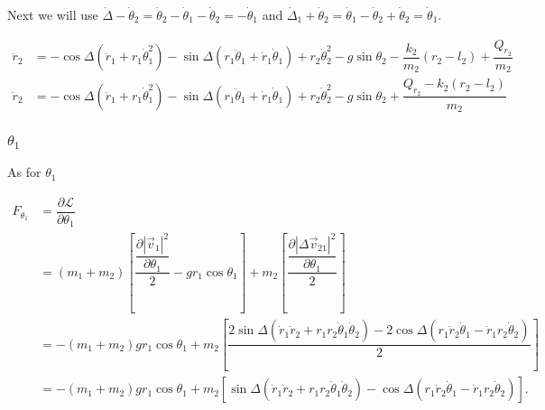 \documentclass[12pt,a4paper,portrait]{article}
\newcommand{\lag}{\mathcal{L}}
\begin{document}
\begin{landscape}
Next we will use $\dot{\Delta} - \dot{\theta}_2 = \dot{\theta}_2-\dot{\theta}_1 - \dot{\theta}_2 = -\dot{\theta}_1$ and $\dot{\Delta}_1 + \dot{\theta}_2 = \dot{\theta}_1-\dot{\theta}_2 + \dot{\theta}_2 = \dot{\theta}_1$. 

\begin{align}
	\ddot{r}_2 &= - \cos{\Delta}(\ddot{r}_1 + r_1\dot{\theta}_1^2) - \sin{\Delta}(r_1\ddot{\theta}_1 + \dot{r}_1\dot{\theta}_1) + r_2\dot{\theta}_2^2-g\sin{\theta_2} - \dfrac{k_2}{m_2}(r_2-l_2) + \dfrac{Q_{r_2}}{m_2}\nonumber\\
	\ddot{r}_2 &=- \cos{\Delta}(\ddot{r}_1 + r_1\dot{\theta}_1^2) - \sin{\Delta}(r_1\ddot{\theta}_1 + \dot{r}_1\dot{\theta}_1) + r_2\dot{\theta}_2^2-g\sin{\theta_2}+\dfrac{Q_{r_2}-k_2(r_2-l_2)}{m_2}\label{r2ddotinit}
\end{align}

\subsubsection{$\theta_1$}
As for $\theta_1$

\begin{align*}
	F_{\theta_1} &= \dfrac{\partial \lag}{\partial \theta_1} \\
	&= (m_1+m_2)\left[\dfrac{\dfrac{\partial |\vec{v}_1|^2}{\partial \theta_1}}{2} - gr_1\cos{\theta_1}\right] + m_2\left[\dfrac{\dfrac{\partial |\Delta \vec{v}_{21}|^2}{\partial \theta_1}}{2}\right] \\
	&= -(m_1+m_2)gr_1\cos{\theta_1} + m_2\left[\dfrac{2\sin{\Delta}(\dot{r}_1\dot{r}_2 + r_1r_2\dot{\theta}_1\dot{\theta}_2) - 2\cos{\Delta}(r_1\dot{r}_2\dot{\theta}_1-\dot{r}_1r_2\dot{\theta}_2)}{2}\right] \\
	&= -(m_1+m_2)gr_1\cos{\theta_1} + m_2\left[\sin{\Delta}(\dot{r}_1\dot{r}_2 + r_1r_2\dot{\theta}_1\dot{\theta}_2) - \cos{\Delta}(r_1\dot{r}_2\dot{\theta}_1-\dot{r}_1r_2\dot{\theta}_2)\right].
\end{align*}


\end{landscape}
\end{document}
